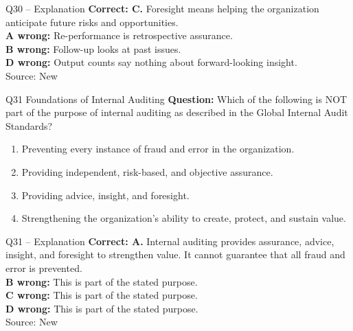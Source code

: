 \documentclass[aspectratio=169,10pt]{beamer}
\begin{document}
\begin{frame}[t]{Q30 -- Explanation}
	\footnotesize
	\textbf{Correct: C.} Foresight means helping the organization anticipate future risks and opportunities. \\[5pt]
\textbf{A wrong:} Re-performance is retrospective assurance. \\[3pt]
\textbf{B wrong:} Follow-up looks at past issues. \\[3pt]
\textbf{D wrong:} Output counts say nothing about forward-looking insight. \\[3pt]
	\vfill {\tiny Source: New}
\end{frame}

\begin{frame}[t]{Q31 \hfill {\scriptsize Foundations of Internal Auditing}}
	\small
	\textbf{Question:} Which of the following is NOT part of the purpose of internal auditing as described in the Global Internal Audit Standards?
	\begin{enumerate}[label=\Alph*.,itemsep=1pt,topsep=3pt]
			\item Preventing every instance of fraud and error in the organization.
			\item Providing independent, risk-based, and objective assurance.
			\item Providing advice, insight, and foresight.
			\item Strengthening the organization's ability to create, protect, and sustain value.
	\end{enumerate}
\end{frame}

\begin{frame}[t]{Q31 -- Explanation}
	\footnotesize
	\textbf{Correct: A.} Internal auditing provides assurance, advice, insight, and foresight to strengthen value. It cannot guarantee that all fraud and error is prevented. \\[5pt]
\textbf{B wrong:} This is part of the stated purpose. \\[3pt]
\textbf{C wrong:} This is part of the stated purpose. \\[3pt]
\textbf{D wrong:} This is part of the stated purpose. \\[3pt]
	\vfill {\tiny Source: New}
\end{frame}
\end{document}

